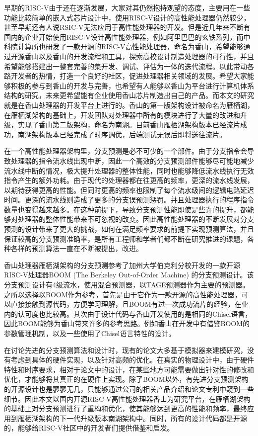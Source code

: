 早期的RISC-V由于还在逐渐发展，大家对其仍然抱持观望的态度，主要用在一些功能比较简单的嵌入式芯片设计中，使用RISC-V设计的高性能处理器仍然较少，甚至早期还有人说RSIC-V无法应用于高性能处理器的开发。但是近几年来不断有国内的企业开始使用RISC-V设计高性能处理器，例如阿里巴巴的玄铁系列\cite{xuantie}，而中科院计算所也研发了一款开源的RISC-V高性能处理器，命名为香山\cite{xiangshan}，希望能够通过开源香山以及香山的开发流程和工具，探索高校设计制造处理器的可行性，并且希望能够搭建出一整套完善的集开发、调试、评估为一体的迭代流程。以此带动各路开发者的热情，打造一个良好的社区，促进处理器相关领域的发展。希望大家能够积极的参与到香山的开发与完善，也希望有人能够以香山为平台进行计算机体系结构的研究，未来更希望能有企业使用香山芯片制造出自己的产品。而本文的研究就是在香山处理器的开发平台上进行的。香山的第一版架构设计被命名为雁栖湖，在雁栖湖架构的基础上，开发团队对处理器中所有的模块进行了大量的改进和升级，实现了香山第二版架构，命名为南湖。目前香山雁栖湖架构版本已经流片成功，南湖架构版本已经完成了时序调优，后端测试无误后即将送往流片。

在一个高性能处理器架构里，分支预测是必不可少的一个部件。由于分支指令会导致处理器的指令流水线出现中断，因此一个高效的分支预测部件能够尽可能地减少流水线中断的情况，极大提升处理器的整体性能，同时也能够降低流水线执行无效指令产生的额外功耗。由于现代的处理器都在往更高的频率，更深的流水线发展，以期待获得更高的性能。但同时更高的频率也限制了每个流水级间的逻辑电路延迟时间。更深的流水线则造成了更多的分支误预测惩罚。并且处理器执行的程序指令数量也变得越来越多。在这种前提下，导致分支预测性能即使是些许的提升，都能够对处理器的整体性能带来不可忽视的改变。因此高性能处理器的不断发展对分支预测的设计带来了更大的挑战\cite{bpu-overview}，如何在满足频率要求的前提下实现预测算法，并且保证较高的分支预测准确率，是所有工程师和学者们都不断在研究推进的课题，各种各样的预测算法一直在不断被提出，改进。

香山处理器雁栖湖架构的分支预测参考了加州大学伯克利分校开发的一款开源RISC-V处理器BOOM (The Berkeley Out-of-Order Machine) 的分支预测设计\cite{boom-spec}。该分支预测设计有4级流水，使用混合预测器，以TAGE预测器作为主要的预测器。之所以选择以BOOM作为参考，首先是由于它作为一款开源的高性能处理器，可以直接接触到源代码，方便学习理解，且BOOM有过一次成功流片的经验，在业内的认可度也比较高。其次由于设计代码与香山开发使用的是相同的Chisel语言\cite{chisel}，因此BOOM能够为香山带来许多的参考思路。例如香山在开发中有借鉴BOOM的参数管理机制，以及一些使用了Chisel语言特性的设计。

在讨论先进的分支预测算法和设计时，现有的论文大多基于模拟器来建模研究，没有考虑到具体的硬件实现，以及针对高频的优化。在真实的物理设计中，由于硬件特性和时序要求，相对于论文中的设计，在某些地方可能需要做出针对性的修改和优化，才能够将其真正的在硬件上实现。除了BOOM以外，有先进分支预测架构的开源设计也是寥寥无几，只能够通过公司的相关产品介绍和论文专利中窥到一些细节。因此本文以国内开源RISC-V高性能处理器香山为研究平台，在雁栖湖架构的基础上对分支预测进行了重构和优化，使其能够达到更高的性能和频率，最终应用到雁栖湖架构的下一代升级版本南湖架构中。同时，所有的设计代码都是开源的，能够给RISC-V社区中的开发者们提供借鉴和启发。

